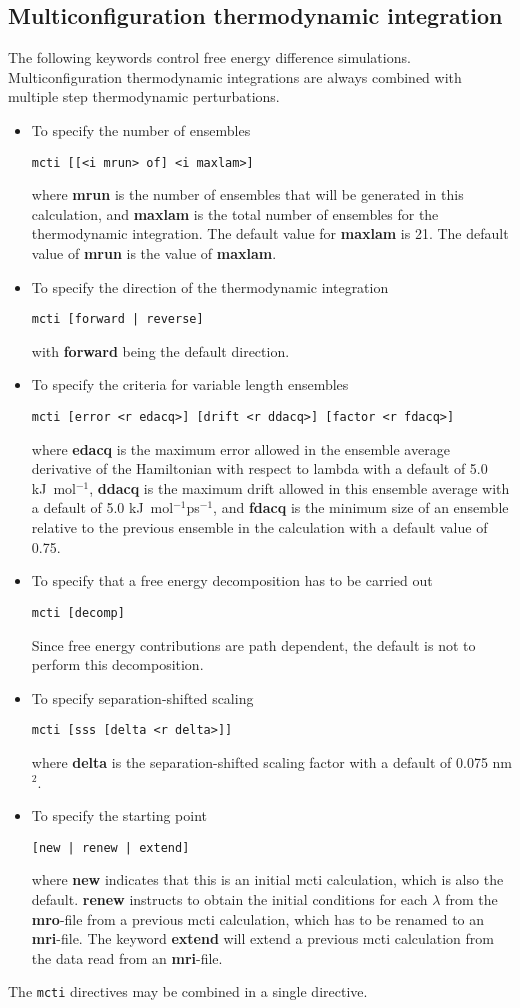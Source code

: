 \subsection{Multiconfiguration thermodynamic integration}
The following keywords control free energy difference simulations.
Multiconfiguration thermodynamic integrations are always combined
with multiple step thermodynamic perturbations.
\begin{itemize}
\item
To specify the number of ensembles
\begin{verbatim}
mcti [[<i mrun> of] <i maxlam>] 
\end{verbatim}
where {\bf mrun} is the number of ensembles that will be generated in
this calculation, and {\bf maxlam} is the total number of ensembles
for the thermodynamic integration. The default value for {\bf maxlam}
is 21. The default value of {\bf mrun} is the value of {\bf maxlam}.
\item
To specify the direction of the thermodynamic integration
\begin{verbatim}
mcti [forward | reverse] 
\end{verbatim}
with {\bf forward} being the default direction.
\item
To specify the criteria for variable length ensembles
\begin{verbatim}
mcti [error <r edacq>] [drift <r ddacq>] [factor <r fdacq>]
\end{verbatim}
where {\bf edacq} is the maximum error allowed in the ensemble average 
derivative of the Hamiltonian with respect to lambda with a default
of 5.0 kJ~mol$^{-1}$, {\bf ddacq} is the maximum drift allowed in this
ensemble average with a default of 5.0 kJ~mol$^{-1}$ps$^{-1}$, and
{\bf fdacq} is the minimum size of an ensemble relative to the
previous ensemble in the calculation with a default value of 0.75.
\item
To specify that a free energy decomposition has to be carried out
\begin{verbatim}
mcti [decomp]
\end{verbatim}
Since free energy contributions are path dependent, the default is not
to perform this decomposition.
\item
To specify separation-shifted scaling
\begin{verbatim}
mcti [sss [delta <r delta>]]
\end{verbatim}
where {\bf delta} is the separation-shifted scaling factor with a default
of 0.075 nm$^2$.
\item
To specify the starting point
\begin{verbatim}
[new | renew | extend]
\end{verbatim}
where {\bf new} indicates that this is an initial mcti calculation, which
is also the default. {\bf renew} instructs to obtain the initial
conditions for each $\lambda$ from the {\bf mro}-file from a previous 
mcti calculation, which has to be renamed to an {\bf mri}-file. The
keyword {\bf extend} will extend a previous mcti calculation from the
data read from an {\bf mri}-file.
\end{itemize}
The \verb+mcti+ directives may be combined in a single directive.

